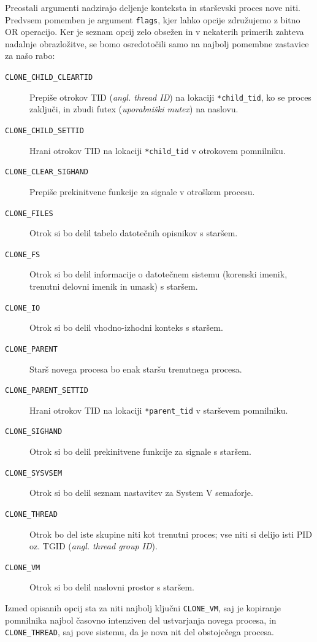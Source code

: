 \documentclass[a4paper,12pt,openright]{book}
\begin{document}
Preostali argumenti nadzirajo deljenje konteksta in starševski proces nove niti.
Predvsem pomemben je argument \texttt{flags}, kjer lahko opcije združujemo z bitno OR operacijo.
Ker je seznam opcij zelo obsežen in v nekaterih primerih zahteva nadalnje obrazložitve, se bomo osredotočili samo na najbolj pomembne zastavice za našo rabo:
\begin{description}
	\item [\texttt{CLONE\_CHILD\_CLEARTID}] Prepiše otrokov TID (\textit{angl. thread ID}) na lokaciji \texttt{*child\_tid}, ko se proces zaključi, in zbudi futex (\textit{uporabniški mutex}) na naslovu.
	\item [\texttt{CLONE\_CHILD\_SETTID}] Hrani otrokov TID na lokaciji \texttt{*child\_tid} v otrokovem pomnilniku.
	\item [\texttt{CLONE\_CLEAR\_SIGHAND}] Prepiše prekinitvene funkcije za signale v otroškem procesu.
	\item [\texttt{CLONE\_FILES}] Otrok si bo delil tabelo datotečnih opisnikov s staršem.
	\item [\texttt{CLONE\_FS}] Otrok si bo delil informacije o datotečnem sistemu (korenski imenik, trenutni delovni imenik in umask) s staršem.
	\item [\texttt{CLONE\_IO}] Otrok si bo delil vhodno-izhodni konteks s staršem.
	\item [\texttt{CLONE\_PARENT}] Starš novega procesa bo enak staršu trenutnega procesa.
	\item [\texttt{CLONE\_PARENT\_SETTID}] Hrani otrokov TID na lokaciji \texttt{*parent\_tid} v starševem pomnilniku.
	\item [\texttt{CLONE\_SIGHAND}] Otrok si bo delil prekinitvene funkcije za signale s staršem.
	\item [\texttt{CLONE\_SYSVSEM}] Otrok si bo delil seznam nastavitev za System V semaforje.
	\item [\texttt{CLONE\_THREAD}] Otrok bo del iste skupine niti kot trenutni proces; vse niti si delijo isti PID oz. TGID (\textit{angl. thread group ID}).
	\item [\texttt{CLONE\_VM}] Otrok si bo delil naslovni prostor s staršem.
\end{description}

Izmed opisanih opcij sta za niti najbolj ključni \texttt{CLONE\_VM}, saj je kopiranje pomnilnika najbol časovno intenziven del ustvarjanja novega procesa, in \texttt{CLONE\_THREAD}, saj pove sistemu, da je nova nit del obstoječega procesa.
\end{document}
